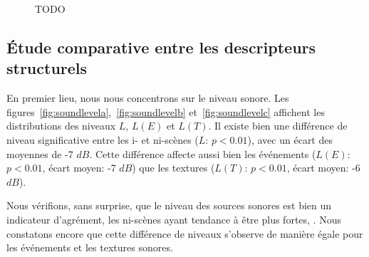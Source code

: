 \begin{figure}[t]
        \myfloatalign
       \caption[TODO]{TODO}\label{fig:xp2_A}
\end{figure}
 
\subsection{Étude comparative entre les descripteurs structurels}

En premier lieu, nous nous concentrons sur le niveau sonore. Les figures~\ref{fig:soundlevela},~\ref{fig:soundlevelb} et~\ref{fig:soundlevelc} affichent les distributions des niveaux $L$, $L(E)$ et $L(T)$. Il existe bien une différence de niveau  significative entre les i- et ni-scènes ($L$: $p<0.01$), avec un écart des moyennes de -7 $dB$. Cette différence affecte aussi bien les événements ($L(E)$: $p<0.01$, écart moyen: -7 $dB$) que les textures ($L(T)$: $p<0.01$, écart moyen: -6 $dB$). 

Nous vérifions, sans surprise, que le niveau des sources sonores est bien un indicateur d'agrément, les ni-scènes ayant tendance à être plus fortes,  . Nous constatons encore que cette différence de niveaux s'observe de manière égale pour les événements et les textures sonores. 

